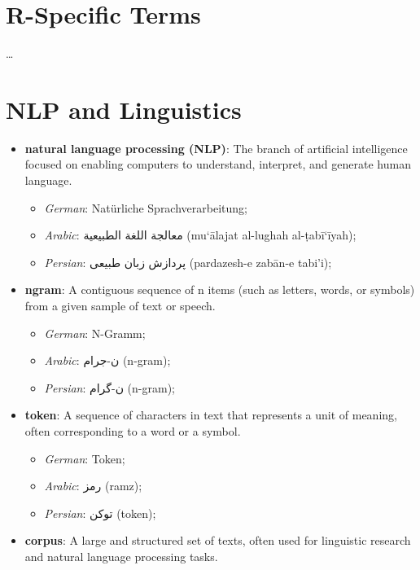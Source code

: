 \documentclass[
]{book}
\providecommand{\tightlist}{%
  \setlength{\itemsep}{0pt}\setlength{\parskip}{0pt}}
\begin{document}
\hypertarget{r-specific-terms}{%
\section{R-Specific Terms}\label{r-specific-terms}}

\ldots{}

\hypertarget{nlp-and-linguistics}{%
\section{NLP and Linguistics}\label{nlp-and-linguistics}}

\begin{itemize}
\tightlist
\item
  \textbf{natural language processing (NLP)}: The branch of artificial intelligence focused on enabling computers to understand, interpret, and generate human language.

  \begin{itemize}
  \tightlist
  \item
    \emph{German}: Natürliche Sprachverarbeitung;
  \item
    \emph{Arabic}: معالجة اللغة الطبيعية (mu`ālajat al-lughah al-ṭabī`īyah);
  \item
    \emph{Persian}: پردازش زبان طبیعی (pardazesh-e zabān-e tabi'i);
  \end{itemize}
\item
  \textbf{ngram}: A contiguous sequence of n items (such as letters, words, or symbols) from a given sample of text or speech.

  \begin{itemize}
  \tightlist
  \item
    \emph{German}: N-Gramm;
  \item
    \emph{Arabic}: ن-جرام (n-gram);
  \item
    \emph{Persian}: ن-گرام (n-gram);
  \end{itemize}
\item
  \textbf{token}: A sequence of characters in text that represents a unit of meaning, often corresponding to a word or a symbol.

  \begin{itemize}
  \tightlist
  \item
    \emph{German}: Token;
  \item
    \emph{Arabic}: رمز (ramz);
  \item
    \emph{Persian}: توکن (token);
  \end{itemize}
\item
  \textbf{corpus}: A large and structured set of texts, often used for linguistic research and natural language processing tasks.


\end{itemize}
\end{document}
